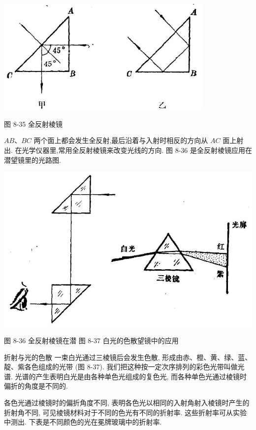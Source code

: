 \documentclass[10pt]{article}
\begin{document}
\begin{center}
\includegraphics[max width=0.8\textwidth]{images/01913056-1f15-74d8-9184-9aab52c9d66b_271_600240.jpg}
\end{center}

图 8-35 全反射棱镜

\({AB}\text{、}{BC}\) 两个面上都会发生全反射,最后沿着与入射时相反的方向从 \({AC}\) 面上射出. 在光学仪器里,常用全反射棱镜来改变光线的方向. 图 8-36 是全反射棱镜应用在潜望镜里的光路图.

\begin{center}
\includegraphics[max width=1.0\textwidth]{images/01913056-1f15-74d8-9184-9aab52c9d66b_272_152264.jpg}
\end{center}

图 8-36 全反射棱镜在潜 图 8-37 白光的色散望镜中的应用

折射与光的色散 一束白光通过三棱镜后会发生色散, 形成由赤、橙、黄、绿、蓝、靛、紫各色组成的光带 (图 8-37). 我们把这种按一定次序排列的彩色光带叫做光谱. 光谱的产生表明白光是由各种单色光组成的复色光, 而各种单色光通过棱镜时偏折的角度是不同的.

各色光通过棱镜时的偏折角度不同, 表明各色光以相同的入射角射入棱镜时产生的折射角不同, 可见棱镜材料对于不同的色光有不同的折射率. 这些折射率可从实验中测出. 下表是不同颜色的光在冕牌玻璃中的折射率.
\end{document}
